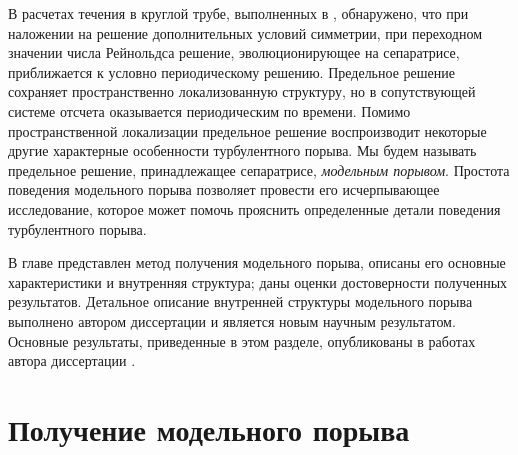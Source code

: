 В расчетах течения в круглой трубе, выполненных в \cite{Avila2013}, обнаружено, что при наложении на решение дополнительных условий симметрии, при переходном значении числа Рейнольдса решение, эволюционирующее на сепаратрисе, приближается к условно периодическому решению. Предельное решение сохраняет пространственно локализованную структуру, но в сопутствующей системе отсчета оказывается периодическим по времени. Помимо пространственной локализации предельное решение воспроизводит некоторые другие характерные особенности турбулентного порыва. Мы будем называть предельное решение, принадлежащее сепаратрисе, {\it модельным порывом}. Простота поведения модельного порыва позволяет провести его исчерпывающее исследование, которое может помочь прояснить определенные детали поведения турбулентного порыва. 

В главе представлен метод получения модельного порыва, описаны его основные характеристики и внутренняя структура; даны оценки достоверности полученных результатов. Детальное описание внутренней структуры модельного порыва выполнено автором диссертации и является новым научным результатом. Основные результаты, приведенные в этом разделе, опубликованы в работах автора диссертации \cite{MZG2015, Kazan2015, KMU2015}. 

\section{Получение модельного порыва} \label{edge_seq}

